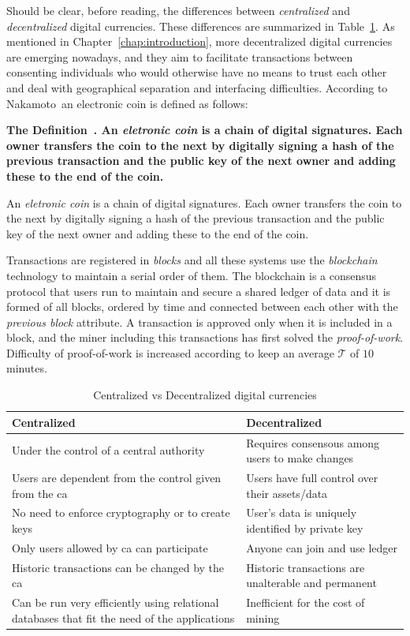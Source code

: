 \documentclass[USenglish]{uit-thesis}
\newcommand{\definition}[1]{%
  \refstepcounter{definition}%
  \par\noindent\textbf{The Definition~\thedefinition. #1}%
  \addcontentsline{def}{definition}
    {\protect\numberline{\thechapter.\thedefinition}#1}\par%
}
\begin{document}
Should be clear, before reading, the differences
between \emph{centralized} and \emph{decentralized} digital currencies.
These differences are summarized in Table~\ref{tab:centralized_vs_decentralized}.
As mentioned in Chapter~\ref{chap:introduction}, more decentralized
digital currencies are emerging nowadays, and they aim
to facilitate transactions between consenting individuals who would otherwise
have no means to trust each other and deal with geographical separation and 
interfacing difficulties.
According to Nakamoto\,\cite{Nakamoto_bitcoin} an electronic coin is defined as
follows:
\definition{An \emph{eletronic coin} is a chain of digital signatures.
	Each owner transfers the coin to the next by digitally signing a hash of
	the previous transaction and the public key of the next owner and adding
	these to the end of the coin.}
Transactions are registered in \emph{blocks} and all these systems use the
\emph{blockchain} technology to maintain a serial order of them.
The blockchain is a consensus protocol that users run to maintain and secure a
shared ledger of data and it is formed of all blocks, ordered by time and connected
between each other with the \emph{previous block} attribute. A transaction is approved
only when it is included in a block, and the miner including this transactions has first
solved the \emph{proof-of-work}. Difficulty of proof-of-work is increased
according to keep an average $\mathcal{T}$ of $10$\,minutes.
\begin{table}
	\caption{Centralized vs Decentralized digital currencies}
	\label{tab:centralized_vs_decentralized}
	\begin{tabular}{|p{5.8cm}|p{5.8cm}|} \hline
		\centering
		\textbf{Centralized}&\textbf{Decentralized}\\
		\hline
		Under the control of a central authority & Requires consensous among users to make changes\\
		\hline
		Users are dependent from the control given from the \gls{ca} & Users have full control over their assets/data\\
		\hline
		No need to enforce cryptography or to create keys & User’s data is uniquely identified by private key \\
		\hline
		Only users allowed by \gls{ca} can participate & Anyone can join and use ledger \\
		\hline
		Historic transactions can be changed by the \gls{ca} & Historic transactions are unalterable and permanent\\
		\hline
		Can be run very efficiently using relational databases that fit the need of the applications & Inefficient for the cost of mining \\
		\hline		
	\end{tabular}
\end{table}
\end{document}
